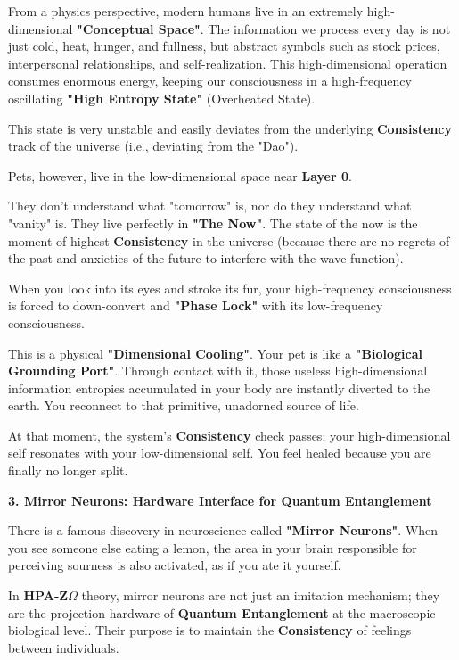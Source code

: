 From a physics perspective, modern humans live in an extremely high-dimensional \textbf{"Conceptual Space"}. The information we process every day is not just cold, heat, hunger, and fullness, but abstract symbols such as stock prices, interpersonal relationships, and self-realization. This high-dimensional operation consumes enormous energy, keeping our consciousness in a high-frequency oscillating \textbf{"High Entropy State"} (Overheated State).

This state is very unstable and easily deviates from the underlying \textbf{Consistency} track of the universe (i.e., deviating from the "Dao").

Pets, however, live in the low-dimensional space near \textbf{Layer 0}.

They don't understand what "tomorrow" is, nor do they understand what "vanity" is. They live perfectly in \textbf{"The Now"}. The state of the now is the moment of highest \textbf{Consistency} in the universe (because there are no regrets of the past and anxieties of the future to interfere with the wave function).

When you look into its eyes and stroke its fur, your high-frequency consciousness is forced to down-convert and \textbf{"Phase Lock"} with its low-frequency consciousness.

This is a physical \textbf{"Dimensional Cooling"}. Your pet is like a \textbf{"Biological Grounding Port"}. Through contact with it, those useless high-dimensional information entropies accumulated in your body are instantly diverted to the earth. You reconnect to that primitive, unadorned source of life.

At that moment, the system's \textbf{Consistency} check passes: your high-dimensional self resonates with your low-dimensional self. You feel healed because you are finally no longer split.

\textbf{3. Mirror Neurons: Hardware Interface for Quantum Entanglement}

There is a famous discovery in neuroscience called \textbf{"Mirror Neurons"}. When you see someone else eating a lemon, the area in your brain responsible for perceiving sourness is also activated, as if you ate it yourself.

In \textbf{HPA-Z$\Omega$} theory, mirror neurons are not just an imitation mechanism; they are the projection hardware of \textbf{Quantum Entanglement} at the macroscopic biological level. Their purpose is to maintain the \textbf{Consistency} of feelings between individuals.

